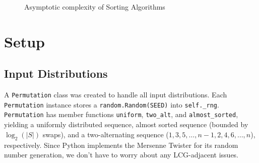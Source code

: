 \documentclass[11pt]{article}
\begin{document}
\begin{figure}[ht]
	\centering
	\caption{Asymptotic complexity of Sorting Algorithms}
	\label{fig:sort-complexities}
\end{figure}

\section{Setup}

\subsection{Input Distributions}
A \texttt{Permutation} class was created to handle all input
distributions. Each \texttt{Permutation} instance stores a
\texttt{random.Random(SEED)} into \texttt{self.\_rng}.
\texttt{Permutation} has member functions \texttt{uniform}, \texttt{two\_alt},
and \texttt{almost\_sorted}, yielding a uniformly distributed sequence,
almost sorted sequence (bounded by $\log_2(|S|)$ swaps), and a
two-alternating sequence ($1, 3, 5, \dots, n-1, 2, 4, 6, \dots, n$),
respectively. Since Python implements the Mersenne Twister for its random
number generation, we don't have to worry about any LCG-adjacent issues.
\end{document}
